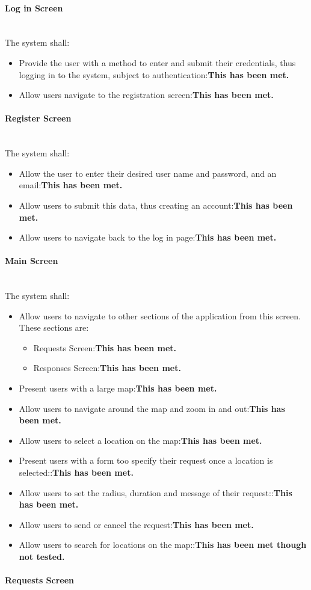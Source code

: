 \documentclass[a4paper]{article}
\newcommand{\subsubsubsection}[1]{\paragraph{#1}\mbox{}\\}
\begin{document}
\subsubsubsection{Log in Screen}
The system shall:
\begin{itemize}
  \item Provide the user with a method to enter and submit their      credentials, thus logging in to the system, subject to      authentication:\textbf{This has been met.}
  \item Allow users navigate to the registration screen:\textbf{This has been met.}
\end{itemize}
\subsubsubsection{Register Screen}
The system shall:
\begin{itemize}
  \item Allow the user to enter their desired user name and password, and an email:\textbf{This has been met.}
  \item Allow users to submit this data, thus creating an account:\textbf{This has been met.}
  \item Allow users to navigate back to the log in page:\textbf{This has been met.}
\end{itemize}
\subsubsubsection{Main Screen}
The system shall:
\begin{itemize}
  \item Allow users to navigate to other sections of the application from this screen. These sections are:
\begin{itemize}
\item Requests Screen:\textbf{This has been met.} 
\item Responses Screen:\textbf{This has been met.} 
\end{itemize}
\item Present users with a large map:\textbf{This has been met.}
\item Allow users to navigate around the map and zoom in and out:\textbf{This has been met.}
\item Allow users to select a location on the map:\textbf{This has been met.}
\item Present users with a form too specify their request once a location is selected::\textbf{This has been met.} 
\item Allow users to set the radius, duration and message of their request::\textbf{This has been met.} 
\item Allow users to send or cancel the request:\textbf{This has been met.} 
\item Allow users to search for locations on the map::\textbf{This has been met though not tested.} 
\end{itemize}
\subsubsubsection{Requests Screen}
\end{document}
